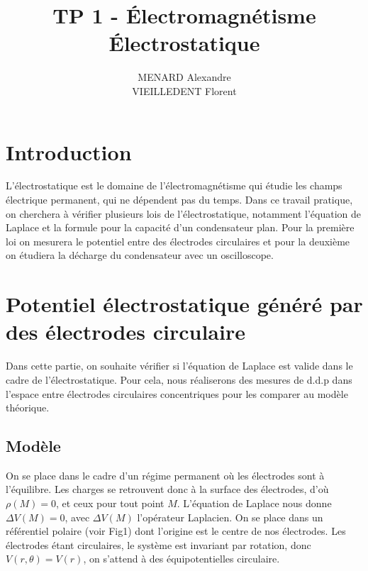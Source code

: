\documentclass[12pt]{article}
\title{\textbf{TP 1 - Électromagnétisme} \\ Électrostatique}
\author{MENARD Alexandre \\ VIEILLEDENT Florent}
\begin{document}
\maketitle

\section*{Introduction}
L'électrostatique est le domaine de l'électromagnétisme qui étudie les champs électrique permanent, qui ne dépendent pas du temps.
Dans ce travail pratique, on cherchera à vérifier plusieurs lois de l'électrostatique, notamment l'équation de Laplace et la formule pour la capacité d'un condensateur plan. 
Pour la première loi on mesurera le potentiel entre des électrodes circulaires et pour la deuxième on étudiera la décharge du condensateur avec un oscilloscope.

\break

\section{Potentiel électrostatique généré par des électrodes circulaire}
	Dans cette partie, on souhaite vérifier si l'équation de Laplace est valide dans le cadre de l'électrostatique. Pour cela, nous réaliserons des mesures de d.d.p
	dans l'espace entre électrodes circulaires concentriques pour les comparer au modèle théorique. 
	
	\subsection{Modèle}
	On se place dans le cadre d'un régime permanent où les électrodes sont à l'équilibre. Les charges se retrouvent donc à la surface des électrodes, d'où $\rho(M) = 0$, et ceux pour tout point $M$.
	L'équation de Laplace nous donne $\Delta V(M) = 0$, avec $\Delta V(M)$ l'opérateur Laplacien. 
	On se place dans un référentiel polaire (voir Fig1) dont l'origine est le centre de nos électrodes. Les électrodes étant circulaires, le système est invariant par rotation, donc $V(r,\theta)=V(r)$, on s'attend à des équipotentielles circulaire.
	
	
\end{document}
